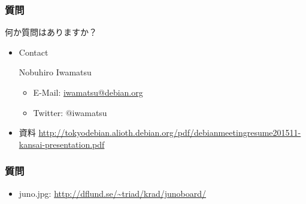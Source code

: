 \documentclass[cjk,dvipdfmx,10pt,compress,%
hyperref={bookmarks=true,bookmarksnumbered=true,bookmarksopen=false,%
colorlinks=false,%
pdftitle={第 103 回 関西 Debian 勉強会},%
pdfauthor={岩松 信洋},%
pdfsubject={資料},%
}]{beamer}
\begin{document}
\begin{frame}[fragile]
  \frametitle{質問}
  何か質問はありますか？
  \newline \newline \newline \newline

  \begin{itemize}
  \item Contact

    Nobuhiro Iwamatsu
    \begin{itemize}
    \item E-Mail: \href{mailto:iwamatsu@debian.org}{iwamatsu@debian.org}
    \item Twitter: $@$iwamatsu

    \end{itemize}

  \item 資料
    \url{http://tokyodebian.alioth.debian.org/pdf/debianmeetingresume201511-kansai-presentation.pdf}
  \end{itemize}
\end{frame}

\begin{frame}[fragile]
  \frametitle{質問}
  \begin{itemize}
  \item juno.jpg: \url{http://dflund.se/~triad/krad/junoboard/}
  \end{itemize}
\end{frame}


\takahashi[50]{  }
\end{document}

